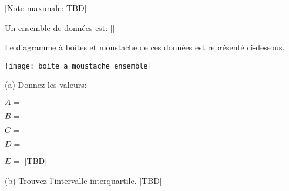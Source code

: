 \begin{question}
  \hspace*{\fill} [Note maximale: TBD]\par
  \medskip
  
  \noindent Un ensemble de données est: [\![ 18, 18, 19, 19, 20, 22, 22, 23, 27, 28, 28, 31, 34, 34, 36 ]\!]\par
  \noindent Le diagramme à boîtes et moustache de ces données est représenté ci-dessous.\par
  
  \medskip
  \texttt{[image: boite\_a\_moustache\_ensemble]}\par  
  \medskip
  (a) Donnez les valeurs:\par
  \hspace{2em}$A =$\par
  \hspace{2em}$B =$\par
  \hspace{2em}$C =$\par
  \hspace{2em}$D =$\par
  \hspace{2em}$E =$\hspace*{\fill} [TBD]\par
  \medskip  
  (b) Trouvez l’intervalle interquartile.\hspace*{\fill} [TBD]\par
\end{question}

